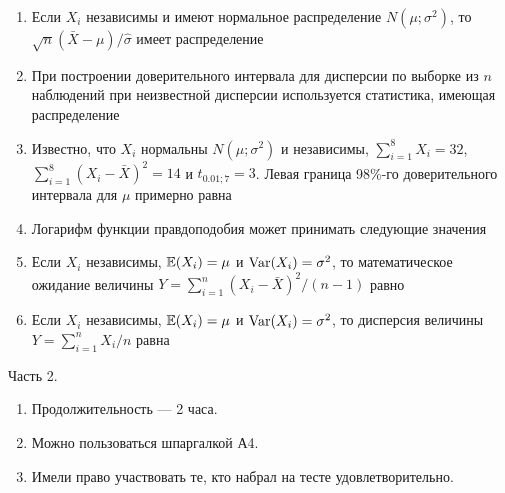 \documentclass[pdftex,12pt,a4paper]{article}
\begin{document}
\begin{enumerate}

\item Если $X_i$ независимы и имеют нормальное распределение $N(\mu;\sigma^2)$, то $\sqrt{n}(\bar{X}-\mu)/\hat{\sigma}$ имеет распределение


\item При построении доверительного интервала для дисперсии по выборке из $n$ наблюдений при неизвестной дисперсии используется статистика, имеющая распределение


\item Известно, что $X_i$ нормальны $N(\mu;\sigma^2)$ и независимы, $\sum_{i=1}^8 X_i=32$, $\sum_{i=1}^8 (X_i-\bar{X})^2=14$ и $t_{0.01;7}=3$. Левая граница 98\%-го доверительного интервала для $\mu$ примерно равна



\item Логарифм функции правдоподобия может принимать следующие значения

\otvet{$[0;1]$}{$(-\infty;0]$}{$(-\infty;+\infty)$}{$[0;+\infty)$}{$[-1;1]$}

\item Если $X_i$ независимы, $\mathbb{E}(X_i)=\mu$ и $\operatorname{Var}(X_i)=\sigma^2$, то математическое ожидание величины $Y=\sum_{i=1}^{n}(X_i-\bar{X})^2/(n-1)$ равно


\item Если $X_i$ независимы, $\mathbb{E}(X_i)=\mu$ и $\operatorname{Var}(X_i)=\sigma^2$, то дисперсия величины $Y=\sum_{i=1}^{n}X_i/n$ равна



\end{enumerate}


Часть 2. 
\begin{enumerate}
\item Продолжительность --- 2 часа.
\item Можно пользоваться шпаргалкой А4.
\item Имели право участвовать те, кто набрал на тесте удовлетворительно.
\end{enumerate}
\end{document}
